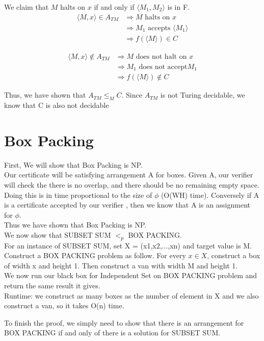 \documentclass[12pt]{article}
\begin{document}
We claim that $M$ halts on $x$ if and only if $\langle M_1,M_2\rangle$ is in F.
\begin{align*}
\langle M,x \rangle \in {A}_{TM} & \Rightarrow  M \textrm{ halts on $x$} \\ 
& \Rightarrow M_1 \textrm{ accepts }  \langle M_1 \rangle \\
& \Rightarrow  f(\langle M \rangle) \in C
\end{align*}


\begin{align*}
\langle M,x \rangle \notin {A}_{TM} & \Rightarrow  M \textrm{ does not halt on $x$} \\ 
& \Rightarrow M_1\textrm{ does not accept} M_1\\
& \Rightarrow  f(\langle M \rangle) \notin C
\end{align*}

Thus, we have shown that $A_{TM} \le_M C $. Since $A_{TM}$ is not Turing decidable, we know that C is also not decidable



\section{Box Packing}


First, We will show that Box Packing is NP.\\
Our certificate will be satisfying arrangement A for boxes. Given A, our verifier will check the there is no overlap, and there should be no remaining empty space. Doing this is in time proportional to the size of $\phi$ (O(WH) time). Conversely if A is a certificate accepted by our verifier , then we know that A is an assignment for $\phi$.\\
Thus we have shown that Box Packing is NP.\\


We now show that SUBSET SUM $<_p$ BOX PACKING.\\
For an instance of  SUBSET SUM, set X = (x1,x2,...,xn) and target value is M.
Construct a BOX PACKING problem as follow. For every $x \in X$, construct a box of width x and height 1. Then construct a van with width M and height 1.\\We now run our black box for Independent Set on BOX PACKING problem and return the same result it gives.\\
Runtime: we construct as many boxes as the number of element in X and we also construct a van, so it takes O(n) time.


To finish the proof, we simply need to show that there is an arrangement for BOX PACKING if and only of there is a solution for SUBSET SUM.\\
\end{document}
